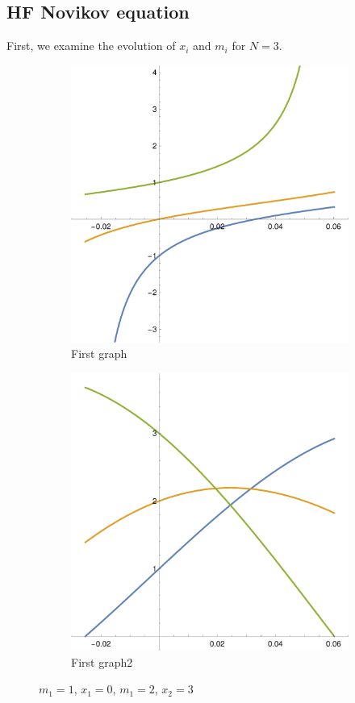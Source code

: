 \documentclass[english,master]{liumaiex}
\theoremstyle{plain}
\theoremstyle{definition}
\begin{document}
\subsection{HF Novikov equation}

First, we examine the evolution of $x_i$ and $m_i$ for $N = 3$.
\begin{figure}[H]
	\begin{subfigure}{0.44\textwidth}
		\includegraphics[width=\textwidth]{graphs/3N/x.pdf}
        \caption{First graph}
    \end{subfigure}
	\hfill
	\begin{subfigure}{0.44\textwidth}
		\includegraphics[width=\textwidth]{graphs/3N/m.pdf}
        \caption{First graph2}
    \end{subfigure}
    \caption{$m_1 = 1$, $x_1 = 0$, $m_1 = 2$, $x_2 = 3$}
\end{figure}
\end{document}

